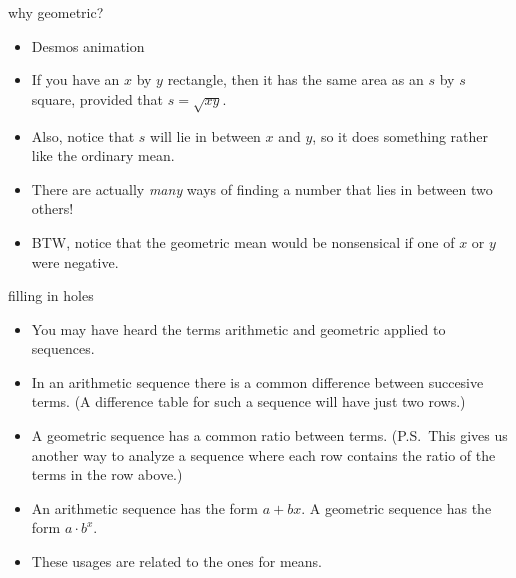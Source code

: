 \documentclass[landscape]{beamer}
\begin{document}
\begin{frame}{why geometric?}
\begin{itemize}
\item Desmos animation \pause
\item If you have an $x$ by $y$ rectangle, then it has the same area as an $s$ by $s$ square, provided that $s=\sqrt{xy}$. \pause
\item Also, notice that $s$ will lie in between $x$ and $y$, so it does something rather like the ordinary mean.\pause
\item There are actually {\em many} ways of finding a number that lies in between two others! \pause
\item BTW, notice that the geometric mean would be  nonsensical if one of $x$ or $y$ were negative. 
\end{itemize}
\end{frame}

\begin{frame}{filling in holes}
\begin{itemize}
\item You may have heard the terms arithmetic and geometric applied to sequences. \pause
\item In an arithmetic sequence there is a common difference between succesive terms. \pause \newline
(A difference table for such a sequence will have just two rows.) \pause
\item A geometric sequence has a common ratio between terms. \pause \newline
(P.S.\ This gives us another way to analyze a sequence where each row contains the ratio of the terms in the row above.) \pause
\item An arithmetic sequence has the form $a+bx$. \pause A geometric sequence has the form $a\cdot b^x$. \pause
\item These usages are related to the ones for means.
\end{itemize}
\end{frame}
\end{document}
